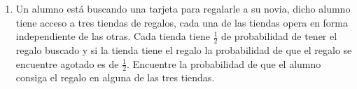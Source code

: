 \documentclass[12pt,a4paper]{report}
\begin{document}
\begin{enumerate}
  \item{
Un alumno está buscando una tarjeta para regalarle a su novia, dicho alumno tiene acceso a tres tiendas de regalos, cada una de las tiendas opera en forma independiente de las otras. Cada tienda tiene $\frac{1}{2}$ de probabilidad de tener el regalo buscado y si la tienda tiene el regalo la probabilidad de que el regalo se encuentre agotado es de $\frac{1}{2}$. Encuentre la probabilidad de que el alumno consiga el regalo en alguna de las tres tiendas.
  }






\end{enumerate}
\end{document}
